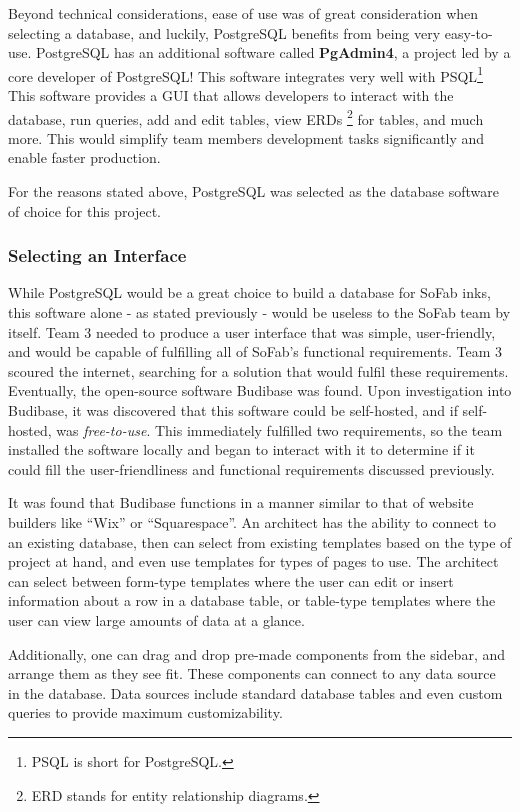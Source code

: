 \documentclass{article}
\begin{document}
Beyond technical considerations, ease of use was of great consideration when selecting a database, and luckily, PostgreSQL 
benefits from being very easy-to-use. PostgreSQL has an additional software called \textbf{PgAdmin4}, a project led by a core developer of 
PostgreSQL! This software integrates very well with PSQL\footnote{PSQL is short for PostgreSQL.}
This software provides a GUI that allows developers to interact with the database, run queries, add and edit tables, view ERDs
\footnote{ERD stands for entity relationship diagrams.} for tables, and much more. This would simplify team members development tasks
significantly and enable faster production. 

For the reasons stated above, PostgreSQL was selected as the database software of choice for this project. 
\subsubsection{Selecting an Interface}
While PostgreSQL would be a great choice to build a database for SoFab inks, this software alone - as stated previously - would be 
useless to the SoFab team by itself. Team 3 needed to produce a user interface that was simple, user-friendly, and would be capable 
of fulfilling all of SoFab's functional requirements. Team 3 scoured the internet, searching for a solution that would fulfil these 
requirements. Eventually, the open-source software Budibase was found. Upon investigation into Budibase, it was discovered that this 
software could be self-hosted, and if self-hosted, was \textit{free-to-use}. This immediately fulfilled two requirements, so the team
installed the software locally and began to interact with it to determine if it could fill the user-friendliness and functional 
requirements discussed previously. 

It was found that Budibase functions in a manner similar to that of website builders like ``Wix'' or ``Squarespace''. An architect
has the ability to connect to an existing database, 
then can select from existing templates based on the type of project at hand, and even use templates for types of pages to use. The 
architect can select between form-type templates where the user can edit or insert information about a row in a database table, or table-type 
templates where the user can view large amounts of data at a glance. 

Additionally, one can drag and drop pre-made components from the sidebar, and arrange them as they see fit. These components can 
connect to any data source in the database. Data sources include standard database tables and even custom queries to provide maximum 
customizability. 
\end{document}
